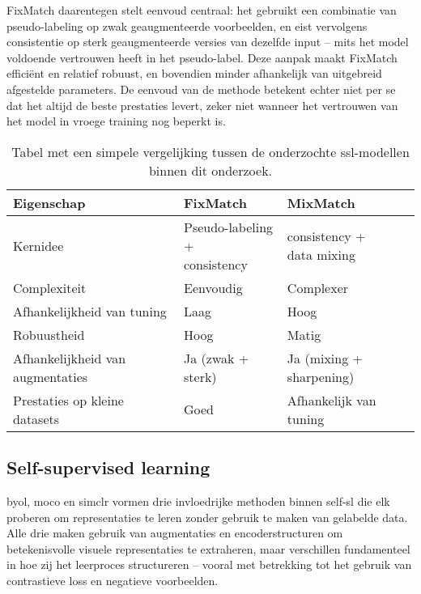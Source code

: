FixMatch daarentegen stelt eenvoud centraal: het gebruikt een combinatie van pseudo-labeling op zwak geaugmenteerde voorbeelden, en eist vervolgens consistentie op sterk geaugmenteerde versies van dezelfde input – mits het model voldoende vertrouwen heeft in het pseudo-label. Deze aanpak maakt FixMatch efficiënt en relatief robuust, en bovendien minder afhankelijk van uitgebreid afgestelde parameters. De eenvoud van de methode betekent echter niet per se dat het altijd de beste prestaties levert, zeker niet wanneer het vertrouwen van het model in vroege training nog beperkt is.

\begin{table}[H]
    \centering
    \begin{tabular}{lll}
        \toprule
        \textbf{Eigenschap} & \textbf{FixMatch} & \textbf{MixMatch} \\
        \midrule
        Kernidee                            & \makecell[l]{Pseudo-labeling + \\ consistency} & \makecell[l]{consistency + \\ data mixing} \\
        Complexiteit                        & Eenvoudig                                    & Complexer \\
        Afhankelijkheid van tuning          & Laag                                         & Hoog \\
        Robuustheid                         & Hoog                                         & Matig \\
        Afhankelijkheid van augmentaties    & Ja (zwak + sterk)                            & Ja (mixing + sharpening) \\
        Prestaties op kleine datasets       & Goed                                         & Afhankelijk van tuning \\
        \bottomrule
    \end{tabular}
    \caption[Vergelijking semi-supervised modellen]{\label{tab:comparison_ssl_models} Tabel met een simpele vergelijking tussen de onderzochte \gls{ssl}-modellen binnen dit onderzoek.}
\end{table}

\subsection{Self-supervised learning}

\gls{byol}, \gls{moco} en \gls{simclr} vormen drie invloedrijke methoden binnen \gls{self-sl} die elk proberen om representaties te leren zonder gebruik te maken van gelabelde data. Alle drie maken gebruik van augmentaties en encoderstructuren om betekenisvolle visuele representaties te extraheren, maar verschillen fundamenteel in hoe zij het leerproces structureren -- vooral met betrekking tot het gebruik van contrastieve loss en negatieve voorbeelden. \\

